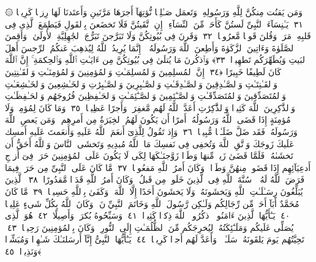  ۞ وَمَن يَقنُت مِنكُنَّ لِلَّهِ وَرَسُولِهِۦ وَتَعمَل صَـٰلِحًۭا نُّؤتِهَآ أَجرَهَا مَرَّتَينِ وَأَعتَدنَا لَهَا رِزقًۭا كَرِيمًۭا ﴿٣١﴾
 يَـٰنِسَآءَ ٱلنَّبِىِّ لَستُنَّ كَأَحَدٍۢ مِّنَ ٱلنِّسَآءِ ۚ إِنِ ٱتَّقَيتُنَّ فَلَا تَخضَعنَ بِٱلقَولِ فَيَطمَعَ ٱلَّذِى فِى قَلبِهِۦ مَرَضٌۭ وَقُلنَ قَولًۭا مَّعرُوفًۭا ﴿٣٢﴾
 وَقَرنَ فِى بُيُوتِكُنَّ وَلَا تَبَرَّجنَ تَبَرُّجَ ٱلجَٰهِلِيَّةِ ٱلأُولَىٰ ۖ وَأَقِمنَ ٱلصَّلَوٰةَ وَءَاتِينَ ٱلزَّكَوٰةَ وَأَطِعنَ ٱللَّهَ وَرَسُولَهُۥٓ ۚ إِنَّمَا يُرِيدُ ٱللَّهُ لِيُذهِبَ عَنكُمُ ٱلرِّجسَ أَهلَ ٱلبَيتِ وَيُطَهِّرَكُم تَطهِيرًۭا ﴿٣٣﴾
 وَٱذكُرنَ مَا يُتلَىٰ فِى بُيُوتِكُنَّ مِن ءَايَـٰتِ ٱللَّهِ وَٱلحِكمَةِ ۚ إِنَّ ٱللَّهَ كَانَ لَطِيفًا خَبِيرًا ﴿٣٤﴾
 إِنَّ ٱلمُسلِمِينَ وَٱلمُسلِمَـٰتِ وَٱلمُؤمِنِينَ وَٱلمُؤمِنَـٰتِ وَٱلقَـٰنِتِينَ وَٱلقَـٰنِتَـٰتِ وَٱلصَّـٰدِقِينَ وَٱلصَّـٰدِقَـٰتِ وَٱلصَّـٰبِرِينَ وَٱلصَّـٰبِرَٰتِ وَٱلخَـٰشِعِينَ وَٱلخَـٰشِعَـٰتِ وَٱلمُتَصَدِّقِينَ وَٱلمُتَصَدِّقَـٰتِ وَٱلصَّـٰٓئِمِينَ وَٱلصَّـٰٓئِمَـٰتِ وَٱلحَـٰفِظِينَ فُرُوجَهُم وَٱلحَـٰفِظَـٰتِ وَٱلذَّٰكِرِينَ ٱللَّهَ كَثِيرًۭا وَٱلذَّٰكِرَٰتِ أَعَدَّ ٱللَّهُ لَهُم مَّغفِرَةًۭ وَأَجرًا عَظِيمًۭا ﴿٣٥﴾
 وَمَا كَانَ لِمُؤمِنٍۢ وَلَا مُؤمِنَةٍ إِذَا قَضَى ٱللَّهُ وَرَسُولُهُۥٓ أَمرًا أَن يَكُونَ لَهُمُ ٱلخِيَرَةُ مِن أَمرِهِم ۗ وَمَن يَعصِ ٱللَّهَ وَرَسُولَهُۥ فَقَد ضَلَّ ضَلَـٰلًۭا مُّبِينًۭا ﴿٣٦﴾
 وَإِذ تَقُولُ لِلَّذِىٓ أَنعَمَ ٱللَّهُ عَلَيهِ وَأَنعَمتَ عَلَيهِ أَمسِك عَلَيكَ زَوجَكَ وَٱتَّقِ ٱللَّهَ وَتُخفِى فِى نَفسِكَ مَا ٱللَّهُ مُبدِيهِ وَتَخشَى ٱلنَّاسَ وَٱللَّهُ أَحَقُّ أَن تَخشَىٰهُ ۖ فَلَمَّا قَضَىٰ زَيدٌۭ مِّنهَا وَطَرًۭا زَوَّجنَـٰكَهَا لِكَى لَا يَكُونَ عَلَى ٱلمُؤمِنِينَ حَرَجٌۭ فِىٓ أَزوَٟجِ أَدعِيَآئِهِم إِذَا قَضَوا۟ مِنهُنَّ وَطَرًۭا ۚ وَكَانَ أَمرُ ٱللَّهِ مَفعُولًۭا ﴿٣٧﴾
 مَّا كَانَ عَلَى ٱلنَّبِىِّ مِن حَرَجٍۢ فِيمَا فَرَضَ ٱللَّهُ لَهُۥ ۖ سُنَّةَ ٱللَّهِ فِى ٱلَّذِينَ خَلَوا۟ مِن قَبلُ ۚ وَكَانَ أَمرُ ٱللَّهِ قَدَرًۭا مَّقدُورًا ﴿٣٨﴾
 ٱلَّذِينَ يُبَلِّغُونَ رِسَـٰلَـٰتِ ٱللَّهِ وَيَخشَونَهُۥ وَلَا يَخشَونَ أَحَدًا إِلَّا ٱللَّهَ ۗ وَكَفَىٰ بِٱللَّهِ حَسِيبًۭا ﴿٣٩﴾
 مَّا كَانَ مُحَمَّدٌ أَبَآ أَحَدٍۢ مِّن رِّجَالِكُم وَلَـٰكِن رَّسُولَ ٱللَّهِ وَخَاتَمَ ٱلنَّبِيِّۦنَ ۗ وَكَانَ ٱللَّهُ بِكُلِّ شَىءٍ عَلِيمًۭا ﴿٤٠﴾
 يَـٰٓأَيُّهَا ٱلَّذِينَ ءَامَنُوا۟ ٱذكُرُوا۟ ٱللَّهَ ذِكرًۭا كَثِيرًۭا ﴿٤١﴾
 وَسَبِّحُوهُ بُكرَةًۭ وَأَصِيلًا ﴿٤٢﴾
 هُوَ ٱلَّذِى يُصَلِّى عَلَيكُم وَمَلَـٰٓئِكَتُهُۥ لِيُخرِجَكُم مِّنَ ٱلظُّلُمَـٰتِ إِلَى ٱلنُّورِ ۚ وَكَانَ بِٱلمُؤمِنِينَ رَحِيمًۭا ﴿٤٣﴾
 تَحِيَّتُهُم يَومَ يَلقَونَهُۥ سَلَـٰمٌۭ ۚ وَأَعَدَّ لَهُم أَجرًۭا كَرِيمًۭا ﴿٤٤﴾
 يَـٰٓأَيُّهَا ٱلنَّبِىُّ إِنَّآ أَرسَلنَـٰكَ شَـٰهِدًۭا وَمُبَشِّرًۭا وَنَذِيرًۭا ﴿٤٥﴾
